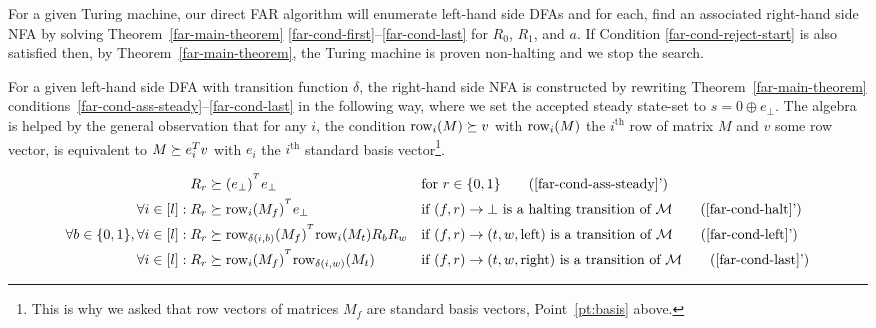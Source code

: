 For a given Turing machine, our direct FAR algorithm will enumerate left-hand side DFAs and for each, find an associated right-hand side NFA by solving Theorem~\ref{far-main-theorem} \eqref{far-cond-first}--\eqref{far-cond-last} for $R_0$, $R_1$, and $a$. If Condition \eqref{far-cond-reject-start} is also satisfied then, by Theorem~\ref{far-main-theorem}, the Turing machine is proven non-halting and we stop the search.


For a given left-hand side DFA with transition function $\delta$, the right-hand side NFA is constructed by rewriting Theorem~\ref{far-main-theorem} conditions~\eqref{far-cond-ass-steady}--\eqref{far-cond-last} in the following way, where we set the accepted steady state-set to $s=0\oplus e_\bot$. The algebra is helped by the general observation that for any $i$, the condition $\text{row}_i(M) \succeq v$ with $\text{row}_i(M)$ the $i^\text{th}$ row of matrix $M$ and $v$ some row vector, is equivalent to $M\succeq e_i^T v$ with $e_i$ the $i^\text{th}$ standard basis vector\footnote{This is why we asked that row vectors of matrices $M_f$ are standard basis vectors, Point~\ref{pt:basis} above.}.



\begin{align}
  R_r                                        & \succeq (e_\bot)^{\T}e_\bot
                                             &                                                  & \text{for }r\in\{0,1\}
  \tag{\ref{far-cond-ass-steady}'}
  \\
  \forall i\in[l]: R_r                       & \succeq \row_i(M_f)^{\T}e_\bot
                                             &                                                  & \text{if $(f,r) \to \bot$ is a halting transition of $\mathcal{M}$}
  \tag{\ref{far-cond-halt}'}
  \\
  \forall b \in\{0,1\}, \forall i\in[l]: R_r & \succeq
  \row_{\delta(i,b)}(M_f)^{\T} \row_i(M_t)R_b R_w
                                             &                                                  & \text{if $(f,r) \to (t,w,\text{left})$ is a transition of $\mathcal{M}$}
  \tag{\ref{far-cond-left}'}
  \\
  \forall i\in[l]: R_r                       & \succeq \row_i(M_f)^{\T} \row_{\delta(i,w)}(M_t)
                                             &                                                  & \text{if $(f,r) \to (t,w,\text{right})$ is a transition of $\mathcal{M}$}
  \tag{\ref{far-cond-last}'}
\end{align}

